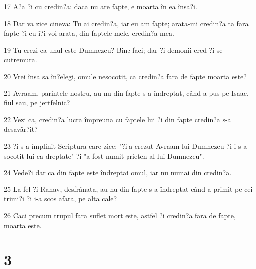 \par 17 A?a ?i cu credin?a: daca nu are fapte, e moarta în ea însa?i.
\par 18 Dar va zice cineva: Tu ai credin?a, iar eu am fapte; arata-mi credin?a ta fara fapte ?i eu î?i voi arata, din faptele mele, credin?a mea.
\par 19 Tu crezi ca unul este Dumnezeu? Bine faci; dar ?i demonii cred ?i se cutremura.
\par 20 Vrei însa sa în?elegi, omule nesocotit, ca credin?a fara de fapte moarta este?
\par 21 Avraam, parintele nostru, au nu din fapte s-a îndreptat, când a pus pe Isaac, fiul sau, pe jertfelnic?
\par 22 Vezi ca, credin?a lucra împreuna cu faptele lui ?i din fapte credin?a s-a desavâr?it?
\par 23 ?i s-a împlinit Scriptura care zice: "?i a crezut Avraam lui Dumnezeu ?i i s-a socotit lui ca dreptate" ?i "a fost numit prieten al lui Dumnezeu".
\par 24 Vede?i dar ca din fapte este îndreptat omul, iar nu numai din credin?a.
\par 25 La fel ?i Rahav, desfrânata, au nu din fapte s-a îndreptat când a primit pe cei trimi?i ?i i-a scos afara, pe alta cale?
\par 26 Caci precum trupul fara suflet mort este, astfel ?i credin?a fara de fapte, moarta este.

\chapter{3}

